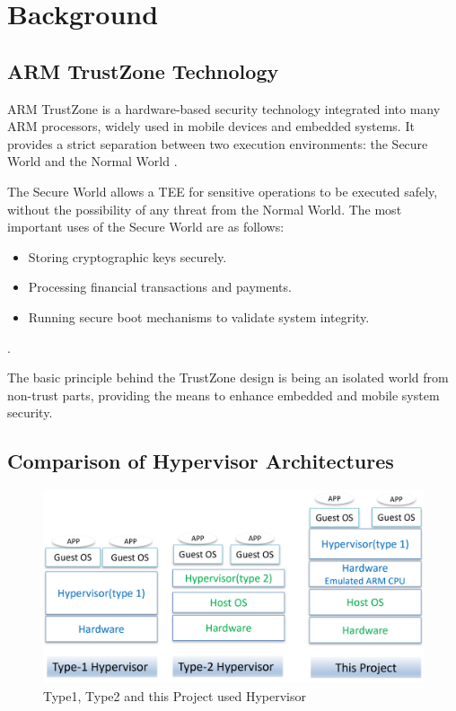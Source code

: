 \documentclass[acmtog]{acmart}
\begin{document}
\section{Background}

\subsection{ARM TrustZone Technology}


ARM TrustZone is a hardware-based security technology integrated into many ARM processors, widely used in mobile devices and embedded systems. It provides a strict separation between two execution environments: the Secure World and the Normal World \cite{10.1145/3426020.3426113, partemu,10.1007/978-3-030-22496-7_9}.

The Secure World allows a TEE for sensitive operations to be executed safely, without the possibility of any threat from the Normal World. The most important uses of the Secure World are as follows:

\begin{itemize}
  \item Storing cryptographic keys securely.
  \item Processing financial transactions and payments.
  \item Running secure boot mechanisms to validate system integrity.
\end{itemize}\cite{ 10.1145/3313808.3313810, partemu,10.1007/978-3-030-22496-7_9}.

The basic principle behind the TrustZone design is being an isolated world from non-trust parts, providing the means to enhance embedded and mobile system security.

\subsection{Comparison of Hypervisor Architectures}
 
\begin{figure}[ht]
  \centering
  \includegraphics[width=\columnwidth]{images/type12_hyper.png}
  \caption{Type1, Type2 and this Project used Hypervisor}
  \label{fig:compare_hypervisor}
\end{figure}
\end{document}
